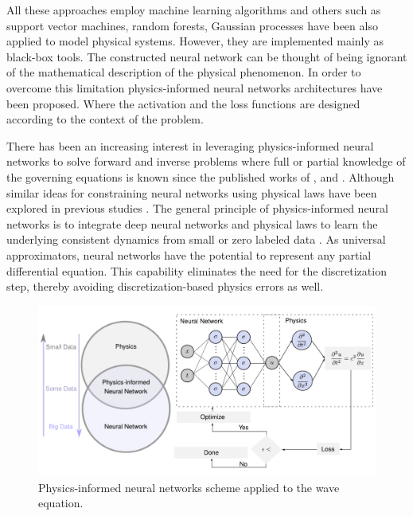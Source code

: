 \documentclass[11pt,twoside]{article}
\begin{document}
All these approaches employ machine learning algorithms and others such as support vector machines, random forests, Gaussian processes have 
been also applied to model physical systems. However, they are implemented mainly as black-box tools. The constructed neural network can be 
thought of being ignorant of the mathematical description of the physical phenomenon. In order to overcome this limitation physics-informed 
neural networks architectures have been proposed. Where the activation and the loss functions are designed according to the context of the 
problem.

There has been an increasing interest in leveraging physics-informed neural networks to solve forward and inverse problems where full or 
partial knowledge of the governing equations is known since the published works of , 
 and . Although similar ideas for constraining neural networks using 
physical laws have been explored in previous studies \citep{lagaris_artificial_1998}. The general principle of physics-informed neural 
networks is to integrate deep neural networks and physical laws to learn the underlying consistent dynamics from small or zero labeled 
data \citep{karniadakis_physics-informed_2021}. As universal approximators, neural networks have the potential to represent any partial 
differential equation. This capability eliminates the need for the discretization step, thereby avoiding discretization-based physics errors 
as well. 

\begin{figure}[H]
\centering
    \includegraphics[width=1.0\textwidth]{figs/Escheme_PINN_waves.pdf}
    \caption{Physics-informed neural networks scheme applied to the wave equation.}
    \label{deep_learning_subset_architecture}
\end{figure}
\end{document}
